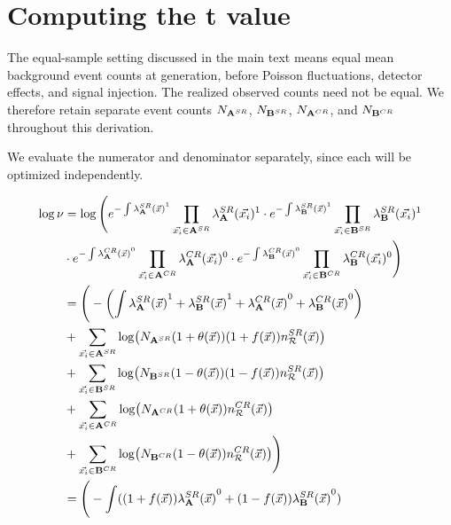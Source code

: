 \documentclass[paper/ddppaper2.tex]{subfiles}
\begin{document}
\section{Computing the t value}\label{Appendix_Tvalue}

The equal-sample setting discussed in the main text means equal mean
background event counts at generation, before Poisson fluctuations,
detector effects, and signal injection. The realized observed counts
need not be equal. We therefore retain separate event counts
$N_{{{\mathbf{A}}^{SR}}}$, $N_{{{\mathbf{B}}^{SR}}}$, $N_{{{\mathbf{A}}^{CR}}}$, and
$N_{{{\mathbf{B}}^{CR}}}$ throughout this derivation.

We evaluate the numerator and denominator separately, since each will be optimized independently.

{
\begin{wideequations}
\begin{equation}
\label{eq:overall_test_statistic_numerator}
\begin{aligned}
    \log \nu &= \log \Bigg(
        e^{- \int \srdist{\dataset{A}}^1} \prod\limits_{\event \in \srdataset{A}} \srdistevent{\dataset{A}}^1
        \cdot
        e^{- \int \srdist{\dataset{B}}^1} \prod\limits_{\event \in \srdataset{B}} \srdistevent{\dataset{B}}^1 \\&
        \cdot
        e^{- \int \crdist{\dataset{A}}^0} \prod\limits_{\event \in \crdataset{A}} \crdistevent{\dataset{A}}^0
        \cdot
        e^{- \int \crdist{\dataset{B}}^0} \prod\limits_{\event \in \crdataset{B}} \crdistevent{\dataset{B}}^0
    \Bigg)
    \\
    &= \Bigg(
        - \left(
            \int \srdist{\dataset{A}}^1 + \srdist{\dataset{B}}^1
            + \crdist{\dataset{A}}^0 + \crdist{\dataset{B}}^0
        \right)
        \\& + \sum\limits_{\event \in \srdataset{A}} \log({N_\srdataset{A}} (1 + {\nparam(\anyevent)}) (1 + f(\anyevent)) \srrefdist) \\&
        + \sum\limits_{\event \in \srdataset{B}} \log({N_\srdataset{B}}  (1 - {\nparam(\anyevent)}) (1 - f(\anyevent)) \srrefdist)
        \\& + \sum\limits_{\event \in \crdataset{A}} \log({N_\crdataset{A}} (1 + {\nparam(\anyevent)}) \crrefdist) \\&
        + \sum\limits_{\event \in \crdataset{B}} \log({N_\crdataset{B}}  (1 - {\nparam(\anyevent)}) \crrefdist)
    \Bigg)
    \\
    &= \Bigg(
            - \int ((1 + f(\anyevent))\srdist{\dataset{A}}^0 + (1 - f(\anyevent))\srdist{\dataset{B}}^0 )

\end{aligned}
\end{equation}
\end{wideequations}}
\end{document}
